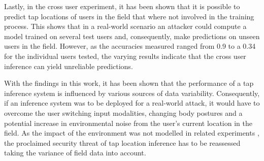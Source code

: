 Lastly, in the cross user experiment, it has been shown that it is possible to predict tap locations of users in the field that where not involved in the training process. This shows that in a real-world scenario an attacker could compute a model trained on several test users and, consequently, make predictions on unseen users in the field. However, as the accuracies measured ranged from 0.9 to a 0.34 for the individual users tested, the varying results indicate that the cross user inference can yield unreliable predictions.

With the findings in this work, it has been shown that the performance of a tap inference system is influenced by various sources of data variability. Consequently, if an inference system was to be deployed for a real-world attack, it would have to overcome the user switching input modalities, changing body postures and a potential increase in environmental noise from the user's current location in the field. As the impact of the environment was not modelled in related experiments \cite{Tapprints,Touchlogger,Accessory}, the proclaimed security threat of tap location inference has to be reassessed taking the variance of field data into account. 






